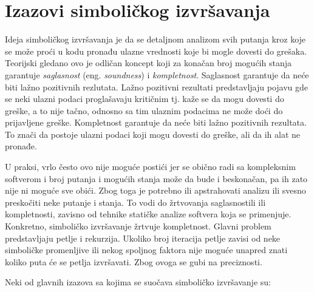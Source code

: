 \documentclass[12pt,oneside]{memoir}
\begin{document}
\section{Izazovi simboličkog izvršavanja}

Ideja simboličkog izvršavanja je da se detaljnom analizom svih putanja kroz koje se može proći u kodu pronađu ulazne vrednosti koje bi mogle dovesti do grešaka. Teorijski gledano ovo je odličan koncept koji za konačan broj mogućih stanja garantuje \textit{saglasnost} (eng. \textit{soundness}) i \textit{kompletnost}. Saglasnost garantuje da neće biti lažno pozitivnih rezlutata. Lažno pozitivni rezultati predstavljaju pojavu gde se neki ulazni podaci proglašavaju kritičnim tj. kaže se da mogu dovesti do greške, a to nije tačno, odnosno sa tim ulaznim podacima ne može doći do prijavljene greške. Kompletnost garantuje da neće biti lažno pozitivnih rezultata. To znači da postoje ulazni podaci koji mogu dovesti do greške, ali da ih alat ne pronađe. 

U praksi, vrlo često ovo nije moguće postići jer se obično radi sa kompleksnim softverom i broj putanja i mogućih stanja može da bude i beskonačan, pa ih zato nije ni moguće sve obići. Zbog toga je potrebno ili apstrahovati analizu ili svesno preskočiti neke putanje i stanja. To vodi do žrtvovanja saglasnostili ili kompletnosti, zavisno od tehnike statičke analize softvera koja se primenjuje. Konkretno, simboličko izvršavanje žrtvuje kompletnost. Glavni problem predstavljaju petlje i rekurzija. Ukoliko broj iteracija petlje zavisi od neke simboličke promenljive ili nekog spoljnog faktora nije moguće unapred znati koliko puta će se petlja izvršavati. Zbog ovoga se gubi na preciznosti. 

Neki od glavnih izazova sa kojima se suočava simboličko izvršavanje su: 
\end{document}
